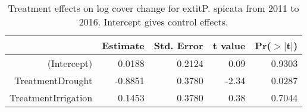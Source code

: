 \begin{table}[ht]
\centering
\caption{Treatment effects on log cover change for 	extit{P. spicata} from 2011 to 2016. Intercept gives control effects.} 
\label{table:changePSSP}
\begin{tabular}{rrrrr}
  \hline
 & Estimate & Std. Error & t value & Pr($>$$|$t$|$) \\ 
  \hline
(Intercept) & 0.0188 & 0.2124 & 0.09 & 0.9303 \\ 
  TreatmentDrought & -0.8851 & 0.3780 & -2.34 & 0.0287 \\ 
  TreatmentIrrigation & 0.1453 & 0.3780 & 0.38 & 0.7044 \\ 
   \hline
\end{tabular}
\end{table}
